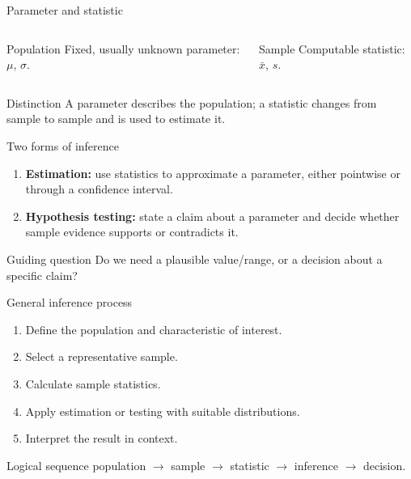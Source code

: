 \documentclass[10pt,aspectratio=169]{beamer}
\begin{document}
\begin{frame}{Parameter and statistic}
  \footnotesize
  \begin{columns}[T]
      \begin{block}{Population}
        Fixed, usually unknown parameter: $\mu$, $\sigma$.
      \end{block}
      \begin{block}{Sample}
        Computable statistic: $\bar{x}$, $s$.
      \end{block}
  \end{columns}
  \begin{alertblock}{Distinction}
    A parameter describes the population; a statistic changes from sample to
    sample and is used to estimate it.
  \end{alertblock}
\end{frame}

\begin{frame}{Two forms of inference}
  \footnotesize
  \begin{enumerate}\itemsep=0.18cm
    \item \textbf{Estimation:} use statistics to approximate a parameter,
      either pointwise or through a confidence interval.
    \item \textbf{Hypothesis testing:} state a claim about a parameter and
      decide whether sample evidence supports or contradicts it.
  \end{enumerate}
  \begin{exampleblock}{Guiding question}
    Do we need a plausible value/range, or a decision about a specific claim?
  \end{exampleblock}
\end{frame}

\begin{frame}{General inference process}
  \footnotesize
  \begin{enumerate}\itemsep=0.12cm
    \item Define the population and characteristic of interest.
    \item Select a representative sample.
    \item Calculate sample statistics.
    \item Apply estimation or testing with suitable distributions.
    \item Interpret the result in context.
  \end{enumerate}
  \begin{block}{Logical sequence}
    \centering population $\longrightarrow$ sample $\longrightarrow$ statistic
    $\longrightarrow$ inference $\longrightarrow$ decision.
  \end{block}
\end{frame}
\end{document}

